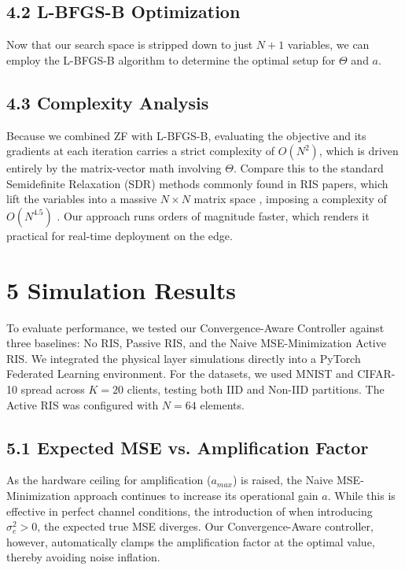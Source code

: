 \documentclass[10pt,twocolumn]{article}
\begin{document}
\subsection{4.2	L-BFGS-B Optimization}

Now that our search space is stripped down to just $N+1$ variables, we can employ the L-BFGS-B algorithm to determine the optimal setup for $\Theta$ and $a$.
\subsection{4.3	Complexity Analysis}

Because we combined ZF with L-BFGS-B, evaluating the objective and its gradients at each iteration carries a strict complexity of $O(N^{2})$, which is driven entirely by the matrix-vector math involving $\Theta$. Compare this to the standard Semidefinite Relaxation (SDR) methods commonly found in RIS papers, which lift the variables into a massive $N\times N$ matrix space , imposing a complexity of $O(N^{4.5})$  \parencite{anish_pradhan_defb987b}. Our approach runs orders of magnitude faster, which renders it practical for real-time deployment on the edge.
\section{5	Simulation Results}

To evaluate performance, we tested our Convergence-Aware Controller against three baselines: No RIS, Passive RIS, and the Naive MSE-Minimization Active RIS. We integrated the physical layer simulations directly into a PyTorch Federated Learning environment. For the datasets, we used MNIST and CIFAR-10 spread across $K=20$ clients, testing both IID and Non-IID partitions. The Active RIS was configured with $N=64$ elements.
\subsection{5.1	Expected MSE vs. Amplification Factor}

As the hardware ceiling for amplification ($a_{max}$) is raised, the Naive MSE-Minimization approach continues to increase its operational gain $a$. While this is effective in perfect channel conditions, the introduction of when introducing $\sigma _{e}^{2}>0$, the expected true MSE diverges. Our Convergence-Aware controller, however, automatically clamps the amplification factor at the optimal value, thereby avoiding noise inflation.
\begin{table}[h!]
\centering
{}\label{tab:b05aef44-cbfa-463f-8a63-5fd8677f9338}
\end{table}
\end{document}

